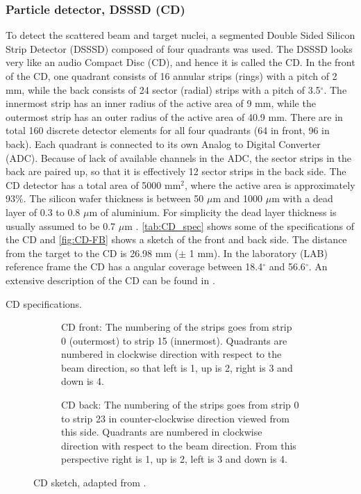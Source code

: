 \documentclass[twoside,english]{uiofysmaster/uiofysmaster}
\begin{document}
\subsubsection{Particle detector, DSSSD (CD)}
To detect the scattered beam and target nuclei, a segmented Double Sided Silicon Strip Detector (DSSSD) composed of four quadrants was used. The DSSSD looks very like an audio Compact Disc (CD), and hence it is called the CD. In the front of the CD, one quadrant consists of 16 annular strips (rings) with a pitch of 2 mm, while the back consists of 24 sector (radial) strips with a pitch of 3.5$^\circ$. The innermost strip has an inner radius of the active area of 9 mm, while the outermost strip has an outer radius of the active area of 40.9 mm. There are in total 160 discrete detector elements for all four quadrants (64 in front, 96 in back). Each quadrant is connected to its own Analog to Digital Converter (ADC). Because of lack of available channels in the ADC, the sector strips in the back are paired up, so that it is effectively 12 sector strips in the back side. The CD detector has a total area of 5000 mm$^2$, where the active area is approximately 93$\%$. The silicon wafer thickness is between 50 $\mu$m and 1000 $\mu$m with a dead layer of 0.3 to 0.8 $\mu$m of aluminium. For simplicity the dead layer thickness is usually assumed to be 0.7 $\mu$m \cite{NWarr-CD, MB-spect}. \autoref{tab:CD_spec} shows some of the specifications of the CD and \autoref{fig:CD-FB} shows a sketch of the front and back side. The distance from the target to the CD is 26.98 mm ($\pm$ 1 mm). In the laboratory (LAB) reference frame the CD has a angular coverage between 18.4$^\circ$ and 56.6$^\circ$. An extensive description of the CD can be found in \cite{CD-DSSSD}.

\begin{table}[ht] 
    \centering 
    \caption{CD specifications.}
	
	\label{tab:CD_spec}
\end{table}


\begin{figure}
	\centering
	\begin{subfigure}{\textwidth}
		
		\caption{CD front: The numbering of the strips goes from strip 0 (outermost) to strip 15 (innermost). Quadrants are numbered in clockwise direction with respect to the beam direction, so that left is 1, up is 2, right is 3 and down is 4.}
		\label{fig:CD-F}
	\end{subfigure}
	\begin{subfigure}{\textwidth}
		
		\caption{CD back: The numbering of the strips goes from strip 0 to strip 23 in counter-clockwise direction viewed from this side. Quadrants are numbered in clockwise direction with respect to the beam direction. From this perspective right is 1, up is 2, left is 3 and down is 4.}
		\label{fig:CD-B}
	\end{subfigure}
	\caption{CD sketch, adapted from \cite{NWarr-CD}.}
	\label{fig:CD-FB}
\end{figure}
\end{document}
